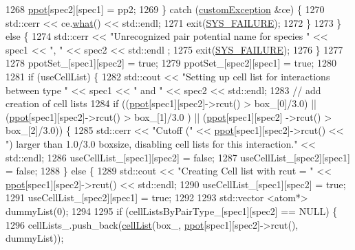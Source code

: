 \begin{DoxyCode}
1268             \hyperlink{classsim_system_ad2e290b5963f132e6a3a56cee35c8e9f}{ppot}[spec2][spec1] = pp2;
1269         \} \textcolor{keywordflow}{catch} (\hyperlink{classcustom_exception}{customException} &ce) \{
1270             std::cerr << ce.\hyperlink{classcustom_exception_aeb6ab5848b038adfc68fde86a512f691}{what}() << std::endl;
1271             exit(\hyperlink{global_8h_a428dfe1ef0a6ff4b1fdebf275f6aff2e}{SYS\_FAILURE});
1272         \}
1273     \} \textcolor{keywordflow}{else} \{
1274         std::cerr << \textcolor{stringliteral}{"Unrecognized pair potential name for species "} << spec1 << \textcolor{stringliteral}{", "} << spec2 << std::endl
      ;
1275         exit(\hyperlink{global_8h_a428dfe1ef0a6ff4b1fdebf275f6aff2e}{SYS\_FAILURE});
1276     \}
1277 
1278     ppotSet\_[spec1][spec2] = \textcolor{keyword}{true};
1279     ppotSet\_[spec2][spec1] = \textcolor{keyword}{true};
1280 
1281     \textcolor{keywordflow}{if} (useCellList) \{
1282         std::cout << \textcolor{stringliteral}{"Setting up cell list for interactions between type "} << spec1 << \textcolor{stringliteral}{" and "} << spec2 << 
      std::endl;
1283         \textcolor{comment}{// add creation of cell lists}
1284         \textcolor{keywordflow}{if} ((\hyperlink{classsim_system_ad2e290b5963f132e6a3a56cee35c8e9f}{ppot}[spec1][spec2]->rcut() > box\_[0]/3.0) || (\hyperlink{classsim_system_ad2e290b5963f132e6a3a56cee35c8e9f}{ppot}[spec1][spec2]->rcut() > box\_[1]/3.0
      ) || (\hyperlink{classsim_system_ad2e290b5963f132e6a3a56cee35c8e9f}{ppot}[spec1][spec2] ->rcut() > box\_[2]/3.0)) \{
1285             std::cerr << \textcolor{stringliteral}{"Cutoff ("} << \hyperlink{classsim_system_ad2e290b5963f132e6a3a56cee35c8e9f}{ppot}[spec1][spec2]->rcut() << \textcolor{stringliteral}{") larger than 1.0/3.0 boxsize,
       disabling cell lists for this interaction."} << std::endl;
1286             useCellList\_[spec1][spec2] = \textcolor{keyword}{false};
1287             useCellList\_[spec2][spec1] = \textcolor{keyword}{false};
1288         \} \textcolor{keywordflow}{else} \{
1289             std::cout << \textcolor{stringliteral}{"Creating Cell list with rcut = "} << \hyperlink{classsim_system_ad2e290b5963f132e6a3a56cee35c8e9f}{ppot}[spec1][spec2]->rcut() << std::endl;
1290             useCellList\_[spec1][spec2] = \textcolor{keyword}{true};
1291             useCellList\_[spec2][spec1] = \textcolor{keyword}{true};
1292 
1293             std::vector <atom*> dummyList(0);
1294 
1295             \textcolor{keywordflow}{if} (cellListsByPairType\_[spec1][spec2] == NULL) \{
1296                 cellLists\_.push\_back(\hyperlink{classcell_list}{cellList}(box\_, \hyperlink{classsim_system_ad2e290b5963f132e6a3a56cee35c8e9f}{ppot}[spec1][spec2]->rcut(), dummyList));

\end{DoxyCode}
